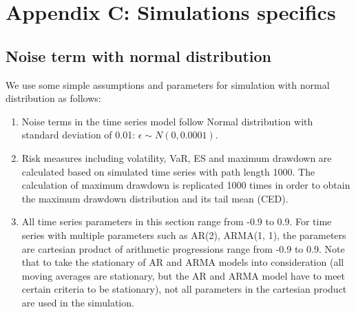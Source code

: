 \documentclass[11pt]{article}
\begin{document}
\section{Appendix C: Simulations specifics} \label{App:AppendixC}
\subsection{Noise term with normal distribution}

We use some simple assumptions and parameters for simulation with normal distribution as follows:

\begin{enumerate}
\item Noise terms in the time series model follow Normal distribution with standard deviation of 0.01: $\epsilon \sim N(0, 0.0001)$.
\item Risk measures including volatility, VaR, ES and maximum drawdown are calculated based on simulated time series with path length 1000. The calculation of maximum drawdown is replicated 1000 times in order to obtain the maximum drawdown distribution and its tail mean (CED).
\item All time series parameters in this section range from -0.9 to 0.9. For time series with multiple parameters such as AR(2), ARMA(1, 1), the parameters are cartesian product of arithmetic progressions range from -0.9 to 0.9. Note that to take the stationary of AR and ARMA models into consideration (all moving averages are stationary, but the AR and ARMA model have to meet certain criteria to be stationary), not all parameters in the cartesian product are used in the simulation.
\end{enumerate}
\end{document}
